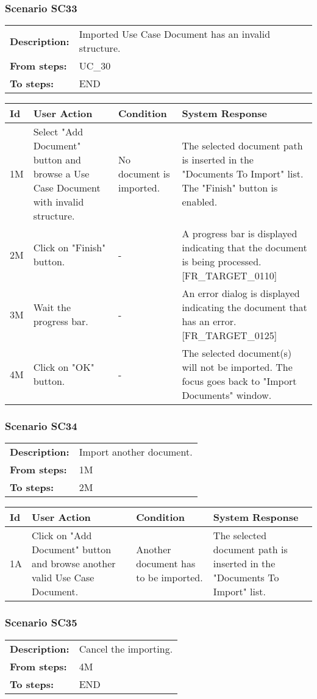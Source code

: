 \documentclass[a4paper,11pt]{article}
\newcommand{\bl}{\\ \hline}
\begin{document}
\subsubsection*{Scenario SC33}
\begin{tabular}{p{1in}p{4in}}
{\bf Description:} & Imported Use Case Document has an invalid structure.
				 \\
{\bf From steps:} & UC_30#2M \\
{\bf To steps:} & END \\
\end{tabular}
 
\begin{tabular}{|p{0.8in}|p{1.6in}|p{1.6in}|p{1.6in}|}
\hline
Id & User Action & Condition & System Response  \bl 
1M & Select "Add Document" button and browse a Use Case Document
						with invalid structure. & No document is imported. & The selected document path is inserted in the "Documents
						To Import" list. The "Finish" button is enabled. \bl 
2M & Click on "Finish" button. & - & A progress bar is displayed indicating that the document
						is being processed. [FR_TARGET_0110]  \bl 
3M & Wait the progress bar. & - & An error dialog is displayed indicating the document that
						has an error. [FR_TARGET_0125]  \bl 
4M & Click on "OK" button. & - & The selected document(s) will not be imported. The focus
						goes back to "Import Documents" window. \bl 
\end{tabular}
\subsubsection*{Scenario SC34}
\begin{tabular}{p{1in}p{4in}}
{\bf Description:} & Import another document. \\
{\bf From steps:} & 1M \\
{\bf To steps:} & 2M \\
\end{tabular}
 
\begin{tabular}{|p{0.8in}|p{1.6in}|p{1.6in}|p{1.6in}|}
\hline
Id & User Action & Condition & System Response  \bl 
1A & Click on "Add Document" button and browse another valid Use
						Case Document. & Another document has to be imported. & The selected document path is inserted in the "Documents
						To Import" list. \bl 
\end{tabular}
\subsubsection*{Scenario SC35}
\begin{tabular}{p{1in}p{4in}}
{\bf Description:} & Cancel the importing. \\
{\bf From steps:} & 4M \\
{\bf To steps:} & END \\
\end{tabular}
 
\end{document}
